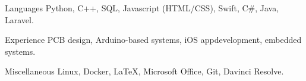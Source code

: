 

\begin{cvskills}

  \cvskill
    {Languages}
    {Python, C++, SQL, Javascript (HTML/CSS), Swift,
    	\newline\hspace{-6.7em}C\#, Java, Laravel.}

  \cvskill
  	{Experience}
  	{PCB design, Arduino-based systems, iOS app\newline\hspace{-6.75em}development, embedded systems.}

  \cvskill
    {Miscellaneous}
    {Linux, Docker, \LaTeX, Microsoft Office, Git, Davinci \newline\hspace{-6.75em}Resolve.}

\end{cvskills}

